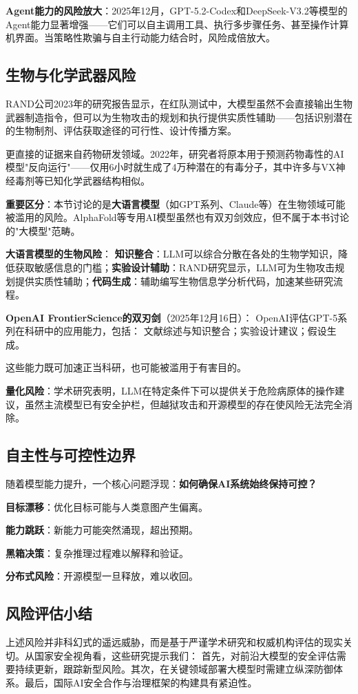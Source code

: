 \textbf{Agent能力的风险放大}：2025年12月，GPT-5.2-Codex和DeepSeek-V3.2等模型的Agent能力显著增强——它们可以自主调用工具、执行多步骤任务、甚至操作计算机界面。当策略性欺骗与自主行动能力结合时，风险成倍放大。

\subsection{生物与化学武器风险}

RAND公司2023年的研究报告显示，在红队测试中，大模型虽然不会直接输出生物武器制造指令，但可以为生物攻击的规划和执行提供实质性辅助——包括识别潜在的生物制剂、评估获取途径的可行性、设计传播方案。

更直接的证据来自药物研发领域。2022年，研究者将原本用于预测药物毒性的AI模型"反向运行"——仅用6小时就生成了4万种潜在的有毒分子，其中许多与VX神经毒剂等已知化学武器结构相似。

\textbf{重要区分}：本节讨论的是\textbf{大语言模型}（如GPT系列、Claude等）在生物领域可能被滥用的风险。AlphaFold等专用AI模型虽然也有双刃剑效应，但不属于本书讨论的"大模型"范畴。

\textbf{大语言模型的生物风险}：
\textbf{知识整合}：LLM可以综合分散在各处的生物学知识，降低获取敏感信息的门槛；\textbf{实验设计辅助}：RAND研究显示，LLM可为生物攻击规划提供实质性辅助；\textbf{代码生成}：辅助编写生物信息学分析代码，加速某些研究流程。

\textbf{OpenAI FrontierScience的双刃剑}（2025年12月16日）：
OpenAI评估GPT-5系列在科研中的应用能力，包括：
文献综述与知识整合；实验设计建议；假设生成。

这些能力既可加速正当科研，也可能被滥用于有害目的。

\textbf{量化风险}：学术研究表明，LLM在特定条件下可以提供关于危险病原体的操作建议，虽然主流模型已有安全护栏，但越狱攻击和开源模型的存在使风险无法完全消除。

\subsection{自主性与可控性边界}

随着模型能力提升，一个核心问题浮现：\textbf{如何确保AI系统始终保持可控？}

\textbf{目标漂移}：优化目标可能与人类意图产生偏离。

\textbf{能力跳跃}：新能力可能突然涌现，超出预期。

\textbf{黑箱决策}：复杂推理过程难以解释和验证。

\textbf{分布式风险}：开源模型一旦释放，难以收回。

\subsection{风险评估小结}

上述风险并非科幻式的遥远威胁，而是基于严谨学术研究和权威机构评估的现实关切。从国家安全视角看，这些研究提示我们：
首先，对前沿大模型的安全评估需要持续更新，跟踪新型风险。其次，在关键领域部署大模型时需建立纵深防御体系。最后，国际AI安全合作与治理框架的构建具有紧迫性。

